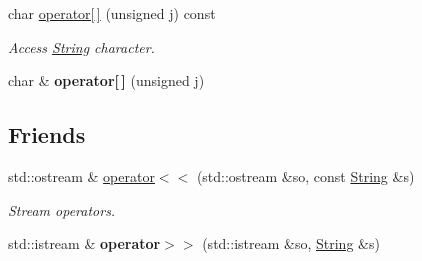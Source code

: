 {\bf }\par
\begin{DoxyCompactItemize}
\item 
char \hyperlink{classString_a3131a12468bb0c6b95bef877ddf16bf0}{operator\mbox{[}$\,$\mbox{]}} (unsigned j) const 
\begin{DoxyCompactList}\small\item\em Access \hyperlink{classString}{String} character. \end{DoxyCompactList}\item 
\hypertarget{classString_adb6033a5757a2a2dd0a6f32f22298ce7}{char \& {\bfseries operator\mbox{[}$\,$\mbox{]}} (unsigned j)}\label{classString_adb6033a5757a2a2dd0a6f32f22298ce7}

\end{DoxyCompactItemize}

\subsection*{Friends}
{\bf }\par
\begin{DoxyCompactItemize}
\item 
std\-::ostream \& \hyperlink{classString_aca402c6a0b7cce1f431a4f117a7b4e36}{operator$<$$<$} (std\-::ostream \&so, const \hyperlink{classString}{String} \&s)
\begin{DoxyCompactList}\small\item\em Stream operators. \end{DoxyCompactList}\item 
\hypertarget{classString_a148e8d19c94cda42dd2011a65e4efd04}{std\-::istream \& {\bfseries operator$>$$>$} (std\-::istream \&so, \hyperlink{classString}{String} \&s)}\label{classString_a148e8d19c94cda42dd2011a65e4efd04}

\end{DoxyCompactItemize}


